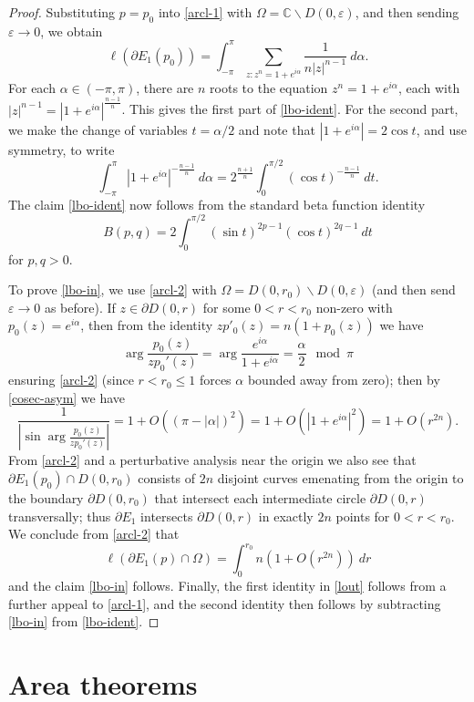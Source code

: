 \documentclass[12pt]{amsart}
\newcommand{\eps}{\varepsilon}
\newcommand{\C}{\mathbb{C}}
\renewcommand{\arg}{\operatorname{arg}}
\begin{document}
\begin{proof}  Substituting $p = p_0$ into \eqref{arcl-1} with $\Omega = \C \backslash D(0,\eps)$, and then sending $\eps \to 0$, we obtain
$$ \ell(\partial E_1(p_0)) = \int_{-\pi}^\pi \sum_{z: z^n = 1+e^{i\alpha}} \frac{1}{n|z|^{n-1}}\ d\alpha.$$
For each $\alpha \in (-\pi,\pi)$, there are $n$ roots to the equation $z^n = 1+e^{i\alpha}$, each with $|z|^{n-1} = |1+e^{i\alpha}|^{\frac{n-1}{n}}$.  This gives the first part of \eqref{lbo-ident}.  For the second part, we make the change of variables $t = \alpha/2$ and note that $|1+e^{i\alpha}| = 2 \cos t$, and use symmetry, to write
$$ \int_{-\pi}^\pi |1+e^{i\alpha}|^{-\frac{n-1}{n}}\ d\alpha = 2^{\frac{n+1}{n}} \int_0^{\pi/2} (\cos t)^{-\frac{n-1}{n}}\ dt.$$
The claim \eqref{lbo-ident} now follows from the standard beta function identity
$$ B(p,q) = 2 \int_0^{\pi/2} (\sin t)^{2p-1} (\cos t)^{2q-1}\ dt$$
for $p,q > 0$.

To prove \eqref{lbo-in}, we use \eqref{arcl-2} with $\Omega = D(0,r_0) \backslash D(0,\eps)$ (and then send $\eps \to 0$ as before).  If $z \in \partial D(0,r)$ for some $0 < r < r_0$ non-zero with $p_0(z) = e^{i\alpha}$, then from the identity $z p'_0(z) = n(1 + p_0(z))$ we have
$$ \arg \frac{p_0(z)}{zp_0'(z)} = \arg \frac{e^{i\alpha}}{1 + e^{i\alpha}} = \frac{\alpha}{2} \mod \pi$$
ensuring \eqref{arcl-2} (since $r < r_0 \leq 1$ forces $\alpha$ bounded away from zero); then by \eqref{cosec-asym} we have
$$ \frac{1}{\left|\sin \arg \frac{p_0(z)}{zp_0'(z)}\right|} = 1 + O((\pi - |\alpha|)^2) = 1 + O(|1 + e^{i\alpha}|^2) = 1 + O(r^{2n}).$$
From \eqref{arcl-2} and a perturbative analysis near the origin we also see that $\partial E_1(p_0) \cap D(0,r_0)$ consists of $2n$ disjoint curves emenating from the origin to the boundary $\partial D(0,r_0)$ that intersect each intermediate circle $\partial D(0,r)$ transversally; thus $\partial E_1$ intersects $\partial D(0,r)$ in exactly $2n$ points for $0 < r < r_0$.  We conclude from \eqref{arcl-2} that
$$
 \ell(\partial E_1(p) \cap \Omega) = \int_0^{r_0} n \left( 1 + O( r^{2n} ) \right)\ dr$$
 and the claim \eqref{lbo-in}  follows.  Finally, the first identity in \eqref{lout} follows from a further appeal to \eqref{arcl-1}, and the second identity then follows by subtracting \eqref{lbo-in} from \eqref{lbo-ident}.
\end{proof}


\section{Area theorems}\label{area-sec}
\end{document}
